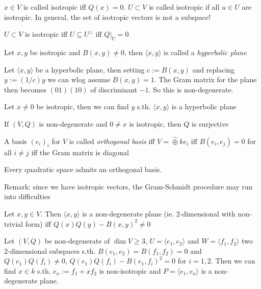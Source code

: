 \begin{definition}
$x\in V$ is called isotropic iff $Q(x) = 0$. $U\subset V$ is called
isotropic if all $u\in U$ are isotropic.
In general, the set of isotropic vectors is not a subspace!
\end{definition}

\begin{remark}
$U\subset V$ is isotropic iff $U\subseteq U^\perp$ iff $Q|_U = 0$
\end{remark}
\begin{definition}
Let $x, y$ be isotropic and $B(x,y)\ne 0$, then $\langle x, y\rangle$
is called a {\em hyperbolic plane}
\end{definition}

\begin{remark}
Let $\langle x, y\rangle$ be a hyperbolic plane, then setting
$c := B(x,y)$ and replacing $y := (1/c)y$ we can wlog assume $B(x,y) = 1$.
The Gram matrix for the plane then becomes $(01)(10)$ of discriminant
$-1$. So this is non-degenerate.
\end{remark}

\begin{proposition}
Let $x\ne 0$ be isotropic, then we can find $y$ s.th. $\langle x, y\rangle$ is
a hyperbolic plane
\end{proposition}

\begin{korollar}
If $(V, Q)$ is non-degenerate and $0\ne x$ is isotropic, then $Q$ is surjective
\end{korollar}

\begin{definition}
A basis $(e_i)_i$ for $V$ is called {\em orthogonal basis} iff
$V = \hat\oplus ke_i$ iff $B(e_i, e_j) = 0$ for all $i\ne j$ iff
the Gram matrix is diagonal
\end{definition}

\begin{theorem}
Every quadratic space admits an orthogonal basis.
\end{theorem}
Remark: since we have isotropic vectors, the Gram-Schmidt procedure may run into
difficulties

\begin{lemma}\label{1.20}
Let $x, y\in V$. Then $\langle x, y\rangle$ is a non-degenerate plane
(ie. 2-dimensional with non-trivial form) iff $Q(x)Q(y) - B(x,y)^2\ne 0$
\end{lemma}

\begin{lemma}\label{1.21}
Let $(V, Q)$ be non-degenerate of $\dim V\ge 3$,
$U = \langle e_1, e_2\rangle$ and $W = \langle f_1, f_2\rangle$ two 2-dimensional subspaces s.th.
$B(e_1, e_2) = B(f_1, f_2) = 0$ and $Q(e_1)Q(f_i)\ne 0$, $Q(e_1)Q(f_i) - B(e_1, f_i)^2 = 0$ for $i=1,2$. Then
we can find $x\in k$ s.th. $e_x := f_1+xf_2$ is non-isotropic and
$P = \langle e_1, e_x\rangle$ is a non-degenerate plane.
\end{lemma}

